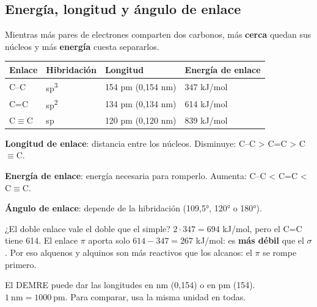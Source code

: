 \subsection{Energía, longitud y ángulo de enlace}
Mientras más pares de electrones comparten dos carbonos, más \textbf{cerca} quedan sus núcleos y más \textbf{energía} cuesta separarlos.

 
\begin{center}\small
\begin{tabular}{@{}llll@{}}
\toprule
\textbf{Enlace} & \textbf{Hibridación} & \textbf{Longitud} & \textbf{Energía de enlace} \\
\midrule
C--C & sp\textsuperscript{3} & 154 pm (0,154 nm) & 347 kJ/mol \\
C=C & sp\textsuperscript{2} & 134 pm (0,134 nm) & 614 kJ/mol \\
C\ensuremath{\equiv}C & sp & 120 pm (0,120 nm) & 839 kJ/mol \\
\bottomrule
\end{tabular}
\end{center}
 

\textbf{Longitud de enlace}: distancia entre los núcleos. Disminuye: C--C > C=C > C\ensuremath{\equiv}C.\par \textbf{Energía de enlace}: energía necesaria para romperlo. Aumenta: C--C < C=C < C\ensuremath{\equiv}C.\par \textbf{Ángulo de enlace}: depende de la hibridación (109,5°, 120° o 180°).

  
\begin{ejemplo} ¿El doble enlace vale el doble que el simple? $2 \cdot 347 = 694$ kJ/mol, pero el C=C tiene 614. El enlace $\pi$ aporta solo $614 - 347 = 267$ kJ/mol: es \textbf{más débil} que el $\sigma$. Por eso alquenos y alquinos son más reactivos que los alcanos: el $\pi$ se rompe primero.\end{ejemplo}
 
\begin{ojo} El DEMRE puede dar las longitudes en nm (0,154) o en pm (154). $1\ \text{nm} = 1000\ \text{pm}$. Para comparar, usa la misma unidad en todas.\end{ojo}
 
